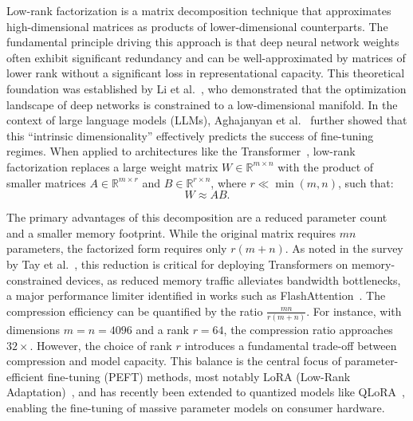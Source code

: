 Low-rank factorization is a matrix decomposition technique that approximates high-dimensional matrices as products of lower-dimensional counterparts. The fundamental principle driving this approach is that deep neural network weights often exhibit significant redundancy and can be well-approximated by matrices of lower rank without a significant loss in representational capacity. This theoretical foundation was established by Li et al.~\cite{li2018measuring}, who demonstrated that the optimization landscape of deep networks is constrained to a low-dimensional manifold. In the context of large language models (LLMs), Aghajanyan et al.~\cite{aghajanyan2020intrinsic} further showed that this ``intrinsic dimensionality'' effectively predicts the success of fine-tuning regimes. When applied to architectures like the Transformer~\cite{vaswani2017attention}, low-rank factorization replaces a large weight matrix $W \in \mathbb{R}^{m \times n}$ with the product of smaller matrices $A \in \mathbb{R}^{m \times r}$ and $B \in \mathbb{R}^{r \times n}$, where $r \ll \min(m,n)$, such that:
\begin{equation}
  W \approx AB.
  \label{eq:lowrank_basic}
\end{equation}

The primary advantages of this decomposition are a reduced parameter count and a smaller memory footprint. While the original matrix requires $mn$ parameters, the factorized form requires only $r(m+n)$. As noted in the survey by Tay et al.~\cite{tay2020efficient}, this reduction is critical for deploying Transformers on memory-constrained devices, as reduced memory traffic alleviates bandwidth bottlenecks, a major performance limiter identified in works such as FlashAttention~\cite{dao2022flashattention}. The compression efficiency can be quantified by the ratio $\frac{mn}{r(m+n)}$. For instance, with dimensions $m = n = 4096$ and a rank $r = 64$, the compression ratio approaches $32\times$. However, the choice of rank $r$ introduces a fundamental trade-off between compression and model capacity. This balance is the central focus of parameter-efficient fine-tuning (PEFT) methods, most notably LoRA (Low-Rank Adaptation)~\cite{hu2021lora}, and has recently been extended to quantized models like QLoRA~\cite{dettmers2023qlora}, enabling the fine-tuning of massive parameter models on consumer hardware.

